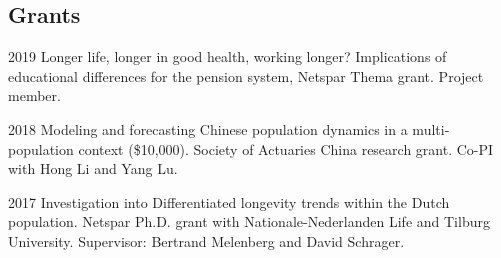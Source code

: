\documentclass[12pt,letterpaper]{report}
\begin{document}
    \subsection*{Grants}

    \begin{tablist}

        \item[2019] \tab Longer life, longer in good health, working longer? Implications of educational differences for the pension system, Netspar Thema grant. Project member. 
        
        \item[2018] \tab  Modeling and forecasting Chinese population dynamics in a multi-population context (\$10,000). Society of Actuaries China research grant. Co-PI with Hong Li and Yang Lu.
        
        \item[2017] \tab Investigation into Differentiated longevity trends within the Dutch population. Netspar Ph.D. grant with Nationale-Nederlanden Life and Tilburg University. Supervisor: Bertrand Melenberg and David Schrager.
%
%
%
%
%
%
%
%
%

    \end{tablist}
\end{document}
